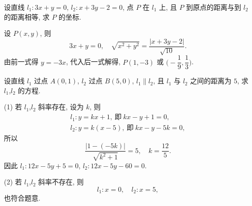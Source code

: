 \begin{exercise}
    设直线 $l_1 \colon 3x+y=0$, $l_2 \colon x+3y-2=0$, 点 $P$ 在 $l_1$ 上, 且 $P$ 到原点的距离与到 $l_2$ 的距离相等, 求 $P$ 的坐标. 
\end{exercise}
\beginsolution
    设 $P(x,y)$, 则
    \[3x+y=0,\quad 
    \sqrt{x^2+y^2}= \frac{|x+3y-2|}{\sqrt{10}}.\]
    由前一式得 $y=-3x$, 代入后一式解得, $P(1,-3)$ 或 $\biggl(-\dfrac19,\dfrac13\biggr)$.
\endsolution

\begin{exercise}
    设直线 $l_1$ 过点 $A(0,1)$, $l_2$ 过点 $B(5,0)$, $l_1\parallel l_2$, 且 $l_1$ 与 $l_2$ 之间的距离为 $5$, 求 $l_1$,$l_2$ 的方程.
\end{exercise}
\beginsolution
    (1) 若 $l_1$,$l_2$ 斜率存在, 设为 $k$, 则
    \[\begin{gathered}
        l_1\colon y=kx+1,\ \text{即}\ kx-y+1=0,\\
        l_2\colon y=k(x-5),\ \text{即}\ kx-y-5k=0,
    \end{gathered}\]
    所以
    \[\frac{|1-(-5k)|}{\sqrt{k^2+1}}= 5,\quad
    k=\frac{12}5.\]
    因此 $l_1\colon 12x-5y+5=0$, $l_2\colon 12x-5y-60=0$.

    (2) 若 $l_1$,$l_2$ 斜率不存在, 则
    \[l_1\colon x=0,\quad l_2\colon x=5,\]
    也符合题意.
\endsolution
